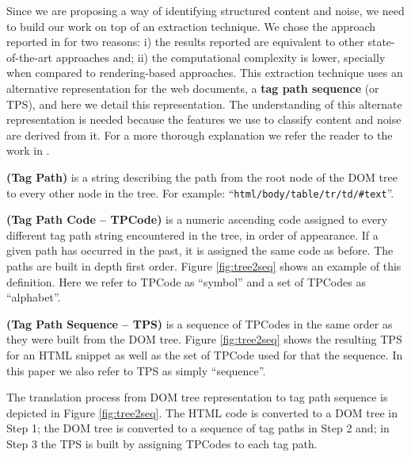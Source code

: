 Since we are proposing a way of identifying structured content and noise, we
need to build our work on top of an extraction technique. We chose the approach
reported in \cite{Velloso:2017:ERW:3132847.3132875} for two reasons: i) the
results reported are equivalent to other state-of-the-art approaches and; ii)
the computational complexity is lower, specially when compared to
rendering-based approaches. This extraction technique uses an alternative
representation for the web documents, a \textbf{tag path sequence} (or TPS), and
here we detail this representation. The understanding of this alternate
representation is needed because the features we use to classify content and
noise are derived from it. For a more thorough explanation we refer the reader
to the work in \cite{Velloso:2017:ERW:3132847.3132875}.

\begin{definition}\textbf{(Tag Path)} is a string describing the path from the
root node of the DOM tree to every other node in the tree. For example:
``\texttt{html/body/table/tr/td/\#text}''.
\end{definition}

\begin{definition}\textbf{(Tag Path Code -- TPCode)}\label{def:tpc} is a numeric
ascending code assigned to every different tag path string encountered in the
tree, in order of appearance. If a given path has occurred in the past, it is
assigned the same code as before. The paths are built in depth first order.
Figure \ref{fig:tree2seq} shows an example of this definition. Here we refer to
TPCode as ``symbol'' and a set of TPCodes as ``alphabet''.
\end{definition}

\begin{definition}\textbf{(Tag Path Sequence -- TPS)} is a sequence of TPCodes
in the same order as they were built from the DOM tree. Figure
\ref{fig:tree2seq} shows the resulting TPS for an HTML snippet as  well as the
set of TPCode used for that the sequence. In this paper we also refer to TPS as
simply ``sequence''.
\end{definition}

The translation process from DOM tree representation to tag path sequence is
depicted in Figure \ref{fig:tree2seq}. The HTML code is converted to a DOM tree
in Step 1; the DOM tree is converted to a sequence of tag paths in Step 2 and;
in Step 3 the TPS is built by assigning TPCodes to each tag path. 

